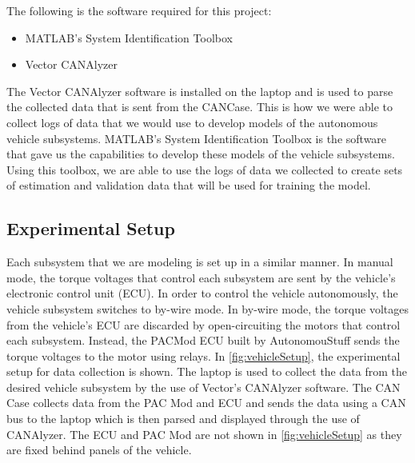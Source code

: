\documentclass[letterpaper,12pt]{article}   %
\begin{document}
	The following is the software required for this project: 
	\begin{itemize}
    		\item MATLAB's System Identification Toolbox 
    		\item Vector CANAlyzer 
 	\end{itemize}
 	The Vector CANAlyzer software is installed on the laptop and is used to parse the collected data that is sent from the CANCase. This is how we were able to collect logs of data that we would use to develop models of the autonomous vehicle subsystems. MATLAB's System Identification Toolbox is the software that gave us the capabilities to develop these models of the vehicle subsystems. Using this toolbox, we are able to use the logs of data we collected to create sets of estimation and validation data that will be used for training the model.

\subsection{Experimental Setup} \label{sec:setup}
Each subsystem that we are modeling is set up in a similar manner. In manual mode, the torque voltages that control each subsystem are sent by the vehicle's electronic control unit (ECU). In order to control the vehicle autonomously, the vehicle subsystem switches to by-wire mode. In by-wire mode, the torque voltages from the vehicle's ECU are discarded by open-circuiting the motors that control each subsystem. Instead, the PACMod ECU built by AutonomouStuff sends the torque voltages to the motor using relays. In \autoref{fig:vehicleSetup}, the experimental setup for data collection is shown. The laptop is used to collect the data from the desired vehicle subsystem by the use of Vector's CANAlyzer software. The CAN Case collects data from the PAC Mod and ECU and sends the data using a CAN bus to the laptop which is then parsed and displayed through the use of CANAlyzer. The ECU and PAC Mod are not shown in \autoref{fig:vehicleSetup} as they are fixed behind panels of the vehicle. 
\end{document}
